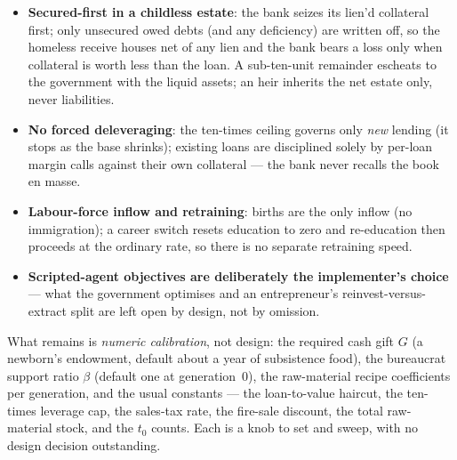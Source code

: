\documentclass[11pt]{article}
\begin{document}
\begin{itemize}
  \item \textbf{Secured-first in a childless estate}: the bank seizes its lien'd
  collateral first; only unsecured owed debts (and any deficiency) are written
  off, so the homeless receive houses net of any lien and the bank bears a loss
  only when collateral is worth less than the loan. A sub-ten-unit remainder
  escheats to the government with the liquid assets; an heir inherits the net
  estate only, never liabilities.
  \item \textbf{No forced deleveraging}: the ten-times ceiling governs only
  \emph{new} lending (it stops as the base shrinks); existing loans are
  disciplined solely by per-loan margin calls against their own collateral ---
  the bank never recalls the book en masse.
  \item \textbf{Labour-force inflow and retraining}: births are the only inflow
  (no immigration); a career switch resets education to zero and re-education then
  proceeds at the ordinary rate, so there is no separate retraining speed.
  \item \textbf{Scripted-agent objectives are deliberately the implementer's
  choice} --- what the government optimises and an entrepreneur's
  reinvest-versus-extract split are left open by design, not by omission.
\end{itemize}

\noindent What remains is \emph{numeric calibration}, not design: the required
cash gift $G$ (a newborn's endowment, default about a year of subsistence food),
the bureaucrat support ratio $\beta$ (default one at generation~0), the
raw-material recipe coefficients per generation, and the usual constants --- the
loan-to-value haircut, the ten-times leverage cap, the sales-tax rate, the
fire-sale discount, the total raw-material stock, and the $t_0$ counts. Each is a
knob to set and sweep, with no design decision outstanding.
\end{document}
